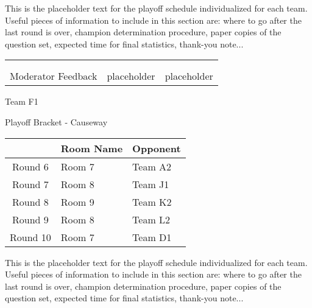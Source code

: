\documentclass{article}%
\begin{document}
\vspace*{30pt}%
\linebreak%
This is the placeholder text for the playoff schedule individualized for each team. Useful pieces of information to include in this section are: where to go after the last round is over, champion determination procedure, paper copies of the question set, expected time for final statistics, thank{-}you note...%
\vspace*{30pt}%
\newline%
%
\begin{tabularx}{\textwidth}{YYY}%
  &  &  \\%
\\%
Moderator Feedback&placeholder&placeholder\\%
\end{tabularx}%
\newpage%
\begin{center}%
\begin{Huge}%
Team F1%
\end{Huge}%
\vspace*{12pt}%
\linebreak%
\begin{Large}%
Playoff Bracket {-} Causeway%
\end{Large}%
\end{center}%
\vspace*{4pt}%
%
\begin{tabularx}{\textwidth}{|c|Y|Y|}%
\hline%
&Room Name&Opponent\\%
\hline%
Round 6&Room 7&Team A2\\%
Round 7&Room 8&Team J1\\%
Round 8&Room 9&Team K2\\%
Round 9&Room 8&Team L2\\%
Round 10&Room 7&Team D1\\%
\hline%
\end{tabularx}%
\vspace*{30pt}%
\linebreak%
This is the placeholder text for the playoff schedule individualized for each team. Useful pieces of information to include in this section are: where to go after the last round is over, champion determination procedure, paper copies of the question set, expected time for final statistics, thank{-}you note...%
\vspace*{30pt}%
\end{document}
